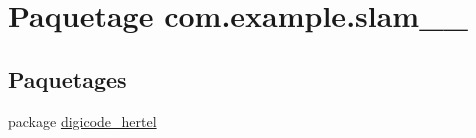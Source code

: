 \hypertarget{namespacecom_1_1example_1_1slam__2017__17}{}\section{Paquetage com.\+example.\+slam\+\_\+\_}
\label{namespacecom_1_1example_1_1slam__2017__17}
\subsection*{Paquetages}
\begin{DoxyCompactItemize}
\item 
package \hyperlink{namespacecom_1_1example_1_1slam__2017__17_1_1digicode__hertel}{digicode\+\_\+hertel}
\end{DoxyCompactItemize}
